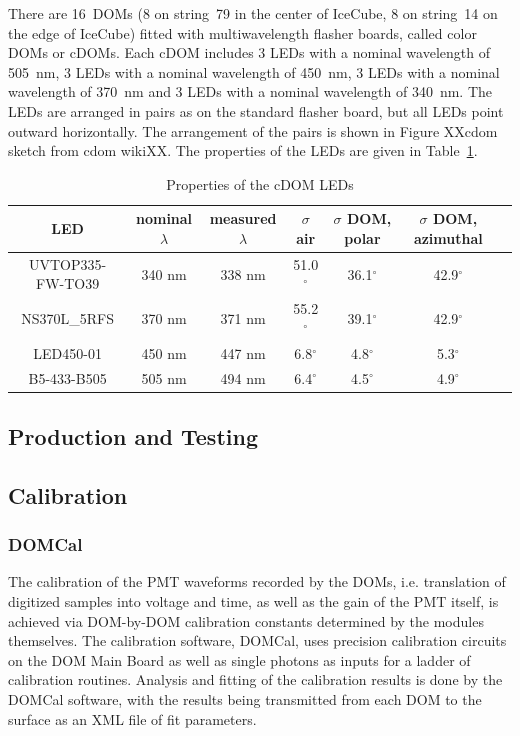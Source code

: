 There are 16~DOMs (8 on string~79 in the center of IceCube, 8 on
string~14 on the edge of IceCube) fitted with multiwavelength flasher boards, called
color DOMs or cDOMs. Each cDOM includes 3 LEDs with a nominal
wavelength of 505~nm, 3 LEDs with a nominal wavelength of 450~nm, 3
LEDs with a nominal wavelength of 370~nm and 3 LEDs with a nominal
wavelength of 340~nm. The LEDs are arranged in pairs as on the
standard flasher board, but all LEDs point outward horizontally. The
arrangement of the pairs is shown in Figure XXcdom sketch from cdom
wikiXX. The properties of the LEDs are given in
Table~\ref{table:cdom_properties}.

\begin{table}
\caption{Properties of the cDOM LEDs}
\begin{tabular}{|c|c|c|c|c|c|c|}
  \hline
 LED& nominal $\lambda$ & measured $\lambda$ & $\sigma$ air & $\sigma$
 DOM, polar & $\sigma$ DOM, azimuthal \\
\hline
UVTOP335-FW-TO39 &340 nm&338 nm&	51.0$^{\circ}$ &	36.1$^{\circ}$ &	42.9$^{\circ}$\\
\hline
NS370L\_5RFS &370 nm&	371 nm&55.2$^{\circ}$&	39.1$^{\circ}$&	42.9$^{\circ}$\\
\hline
LED450-01 & 450 nm& 447 nm&	6.8$^{\circ}$ &	4.8$^{\circ}$ &	5.3$^{\circ}$ \\
\hline
B5-433-B505 & 505 nm& 494 nm& 6.4$^{\circ}$ &	4.5$^{\circ}$ 	&4.9$^{\circ}$ \\
\hline
\end{tabular}
\label{table:cdom_properties}
\end{table}

\subsection{\label{sec:dom_prodtest}  Production and Testing}

\subsection{\label{sec:dom_calibration}  Calibration}

\subsubsection{\label{sec:domcal} DOMCal}

The calibration of the PMT waveforms recorded by the DOMs, i.e. translation
of digitized samples into voltage and time, as well as the gain of the PMT
itself, is achieved via DOM-by-DOM calibration constants determined by the
modules themselves.  The calibration software, DOMCal, uses precision calibration
circuits on the DOM Main Board as well as single photons as inputs
for a ladder of calibration routines.  Analysis and fitting of the
calibration results is done by the DOMCal software, with the results being
transmitted from each DOM to the surface as an XML file of fit parameters.

